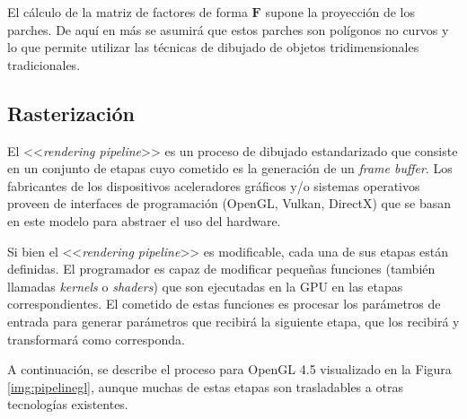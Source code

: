 El cálculo de la matriz de factores de forma $\mathbf{F}$ supone la proyección de los parches. De aquí en más se asumirá que estos parches son polígonos no curvos y lo que permite utilizar las técnicas de dibujado de objetos tridimensionales tradicionales.

\subsection{Rasterización}
\label{sec:rasterizacion}

El <<\textit{rendering pipeline}>> es un proceso de dibujado estandarizado que consiste en un conjunto de etapas cuyo cometido es la generación de un \textit{frame buffer}. Los fabricantes de los dispositivos aceleradores gráficos y/o sistemas operativos proveen de interfaces de programación (OpenGL, Vulkan, DirectX) que se basan en este modelo para abstraer el uso del hardware.

Si bien el <<\textit{rendering pipeline}>> es modificable, cada una de sus etapas están definidas.  El programador es capaz de modificar pequeñas funciones (también llamadas \textit{kernels} o \textit{shaders}) que son ejecutadas en la GPU en las etapas correspondientes. El cometido de estas funciones es procesar los parámetros de entrada para generar parámetros que recibirá la siguiente etapa, que los recibirá y transformará como corresponda.

A continuación, se describe el proceso para OpenGL 4.5 visualizado en la Figura \ref{img:pipelinegl}, aunque muchas de estas etapas son trasladables a otras tecnologías existentes.

